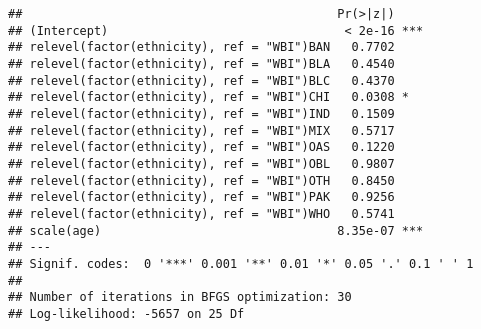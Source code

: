 \documentclass[
]{article}
\begin{document}
\begin{verbatim}
##                                            Pr(>|z|)    
## (Intercept)                                 < 2e-16 ***
## relevel(factor(ethnicity), ref = "WBI")BAN   0.7702    
## relevel(factor(ethnicity), ref = "WBI")BLA   0.4540    
## relevel(factor(ethnicity), ref = "WBI")BLC   0.4370    
## relevel(factor(ethnicity), ref = "WBI")CHI   0.0308 *  
## relevel(factor(ethnicity), ref = "WBI")IND   0.1509    
## relevel(factor(ethnicity), ref = "WBI")MIX   0.5717    
## relevel(factor(ethnicity), ref = "WBI")OAS   0.1220    
## relevel(factor(ethnicity), ref = "WBI")OBL   0.9807    
## relevel(factor(ethnicity), ref = "WBI")OTH   0.8450    
## relevel(factor(ethnicity), ref = "WBI")PAK   0.9256    
## relevel(factor(ethnicity), ref = "WBI")WHO   0.5741    
## scale(age)                                 8.35e-07 ***
## ---
## Signif. codes:  0 '***' 0.001 '**' 0.01 '*' 0.05 '.' 0.1 ' ' 1 
## 
## Number of iterations in BFGS optimization: 30 
## Log-likelihood: -5657 on 25 Df
\end{verbatim}
\end{document}
